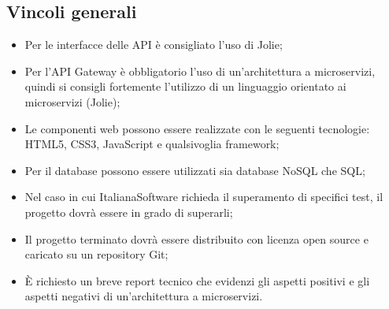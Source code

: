\subsection{Vincoli generali}
\begin{itemize}
\item Per le interfacce delle API è consigliato l'uso di Jolie;
\item Per l'API Gateway è obbligatorio l'uso di un'architettura a microservizi, quindi si consigli fortemente l'utilizzo di un linguaggio orientato ai microservizi (Jolie);
\item Le componenti web possono essere realizzate con le seguenti tecnologie: HTML5, CSS3, JavaScript e qualsivoglia framework;
\item Per il database possono essere utilizzati sia database NoSQL che SQL;
\item Nel caso in cui ItalianaSoftware richieda il superamento di specifici test, il progetto dovrà essere in grado di superarli;
\item Il progetto terminato dovrà essere distribuito con licenza open source e caricato su un repository Git;
\item \MakeUppercase{è} richiesto un breve report tecnico che evidenzi gli aspetti positivi e gli aspetti negativi di un'architettura a microservizi.
\end{itemize}
